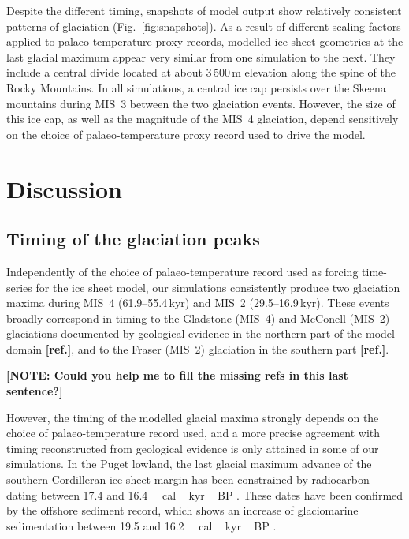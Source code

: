 \documentclass[tc, manuscript]{copernicus}
\newcommand{\note}[1]{\textbf{[NOTE: #1]}}
\newcommand{\aref}[0]{\textbf{[ref.]}}
\begin{document}
Despite the different timing, snapshots of model output show relatively
consistent patterns of glaciation (Fig.~\ref{fig:snapshots}). As a result of
different scaling factors applied to palaeo-temperature proxy records,
modelled ice sheet geometries at the last glacial maximum appear very similar
from one simulation to the next. They include a central divide located at about
3\,500\,m elevation along the spine of the Rocky Mountains. In all
simulations, a central ice cap persists over the Skeena mountains during MIS~3
between the two glaciation events. However, the size of this ice cap, as well
as the magnitude of the MIS~4 glaciation, depend sensitively on the choice of
palaeo-temperature proxy record used to drive the model.


\section{Discussion}
\label{sec:discussion}

\subsection{Timing of the glaciation peaks}

Independently of the choice of palaeo-temperature record used as forcing
time-series for the ice sheet model, our simulations consistently produce two
glaciation maxima during MIS~4 (61.9--55.4\,kyr) and MIS~2
(29.5--16.9\,kyr). These events broadly correspond in timing to the
Gladstone (MIS~4) and McConell (MIS~2) glaciations documented by geological
evidence in the northern part of the model domain \aref, and to the Fraser
(MIS~2) glaciation in the southern part \aref.

\note{Could you help me to fill the missing refs in this last sentence?}

However, the timing of the modelled glacial maxima strongly depends on the
choice of palaeo-temperature record used, and a more precise agreement with
timing reconstructed from geological evidence is only attained in some of our
simulations. In the Puget lowland, the last glacial maximum advance of the
southern Cordilleran ice sheet margin has been constrained by radiocarbon
dating between 17.4 and 16.4\,\unit{\,cal\,kyr\,BP}
\citep[Fig.~4]{Porter.Swanson.1998}.
These dates have been confirmed by the offshore sediment record, which shows an
increase of glaciomarine sedimentation between 19.5 and
16.2\,\unit{\,cal\,kyr\,BP} \citep{Cosma.etal.2008}.
\end{document}
